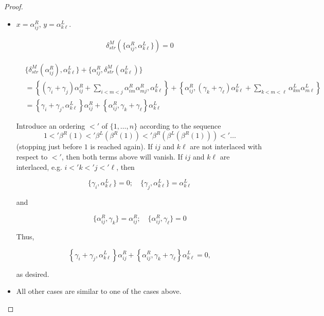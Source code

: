\documentclass[10pt,a4paper]{amsart}
\begin{document}
\begin{proof}
\begin{itemize}
\begin{enumerate}[label=Case \arabic*.]
				as desired.
				
			\end{enumerate}
			
			
			\item $x=\alpha_{ij}^R$, $y=\alpha_{k\ell}^L$. 
			
			\begin{align*}
				\delta_{str}^M\left(\{\alpha_{ij}^R,\alpha_{k\ell}^L\}\right) = 0
			\end{align*}
			
			\begin{align*}
				& \{\delta_{str}^M(\alpha_{ij}^R), \alpha_{k\ell}^L\} + \{\alpha_{ij}^R, \delta_{str}^M(\alpha_{k\ell}^L)\} \\
				&=\left\{(\gamma_i+\gamma_j)\alpha_{ij}^R + \sum_{i<m<j} \alpha_{im}^R\alpha_{mj}^R , \alpha_{k\ell}^L\right\} + \left\{\alpha_{ij}^R, (\gamma_k+\gamma_{\ell}) \alpha_{k\ell}^L + \sum_{k<m<\ell} \alpha_{km}^L \alpha_{m\ell}^L  \right\} \\
				&= \left\{\gamma_i+\gamma_j , \alpha_{k\ell}^L\right\}\alpha_{ij}^R + \left\{\alpha_{ij}^R, \gamma_k+\gamma_{\ell}   \right\}\alpha_{k\ell}^L
			\end{align*}
			
			Introduce an ordering $<'$ of $\{1,\dots, n\}$ according to the sequence 
			\[ 1 <' \beta^R(1) <' \beta^L(\beta^R(1)) <' \beta^R(\beta^L(\beta^R(1))) <' \dots \]
			(stopping just before $1$ is reached again).
			If $ij$ and $k\ell$ are not interlaced with respect to $<'$, then both terms above will vanish. If $ij$ and $k\ell$ are interlaced, e.g. $i<'k<'j<'\ell$, then
			
			\[ \{\gamma_i, \alpha_{k\ell}^L\} = 0; \quad \{\gamma_j, \alpha_{k\ell}^L\} = \alpha_{k\ell}^L \]
			
			and 
			
			\[ \{\alpha_{ij}^R, \gamma_k\} = \alpha_{ij}^R; \quad \{\alpha_{ij}^R, \gamma_\ell\} = 0 \]
			
			
			Thus, 
			
			\[ \left\{\gamma_i+\gamma_j , \alpha_{k\ell}^L\right\}\alpha_{ij}^R + \left\{\alpha_{ij}^R, \gamma_k+\gamma_{\ell}   \right\}\alpha_{k\ell}^L = 0,\]
			
			as desired.
			
			
			
			
			\item All other cases are similar to one of the cases above.
			
			
			
			
			
		\end{itemize}
	\end{proof}
\end{document}
